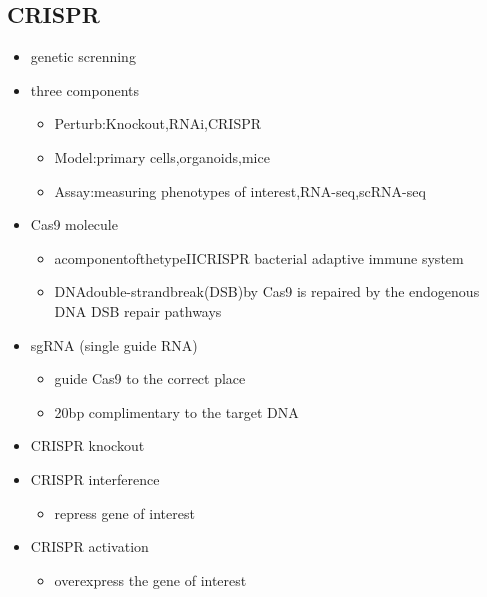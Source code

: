\documentclass[font=12pt]{article}
\begin{document}
\subsection{CRISPR}
\begin{itemize}
	\item genetic screnning
	\item three components
	\begin{itemize}
		\item Perturb:Knockout,RNAi,CRISPR
		\item Model:primary cells,organoids,mice
		\item Assay:measuring phenotypes of interest,RNA-seq,scRNA-seq
	\end{itemize}
	\item Cas9 molecule
	\begin{itemize}
		\item acomponentofthetypeIICRISPR bacterial adaptive immune system
		\item DNAdouble-strandbreak(DSB)by Cas9 is repaired by the endogenous DNA DSB repair pathways
	\end{itemize}
	\item sgRNA (single guide RNA)
	\begin{itemize}
		\item guide Cas9 to the correct place
		\item 20bp complimentary to the target DNA
	\end{itemize}
	\item CRISPR knockout
	\item CRISPR interference
	\begin{itemize}
		\item repress gene of interest
	\end{itemize}
	\item CRISPR activation
	\begin{itemize}
		\item overexpress the gene of interest
	\end{itemize}
\end{itemize}
\end{document}
